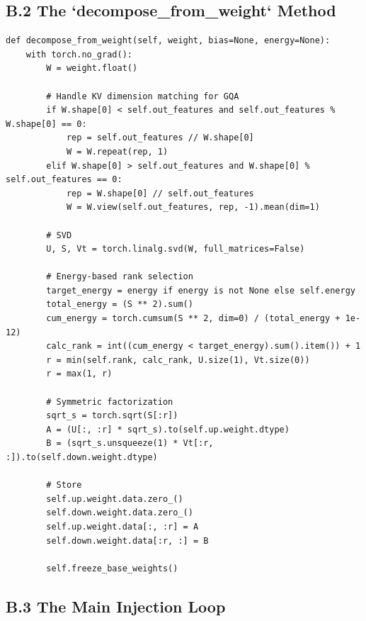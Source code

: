 \subsection{B.2 The `decompose\_from\_weight` Method}

\begin{lstlisting}
def decompose_from_weight(self, weight, bias=None, energy=None):
    with torch.no_grad():
        W = weight.float()
        
        # Handle KV dimension matching for GQA
        if W.shape[0] < self.out_features and self.out_features % W.shape[0] == 0:
            rep = self.out_features // W.shape[0]
            W = W.repeat(rep, 1)
        elif W.shape[0] > self.out_features and W.shape[0] % self.out_features == 0:
            rep = W.shape[0] // self.out_features
            W = W.view(self.out_features, rep, -1).mean(dim=1)
        
        # SVD
        U, S, Vt = torch.linalg.svd(W, full_matrices=False)
        
        # Energy-based rank selection
        target_energy = energy if energy is not None else self.energy
        total_energy = (S ** 2).sum()
        cum_energy = torch.cumsum(S ** 2, dim=0) / (total_energy + 1e-12)
        calc_rank = int((cum_energy < target_energy).sum().item()) + 1
        r = min(self.rank, calc_rank, U.size(1), Vt.size(0))
        r = max(1, r)
        
        # Symmetric factorization
        sqrt_s = torch.sqrt(S[:r])
        A = (U[:, :r] * sqrt_s).to(self.up.weight.dtype)
        B = (sqrt_s.unsqueeze(1) * Vt[:r, :]).to(self.down.weight.dtype)
        
        # Store
        self.up.weight.data.zero_()
        self.down.weight.data.zero_()
        self.up.weight.data[:, :r] = A
        self.down.weight.data[:r, :] = B
        
        self.freeze_base_weights()
\end{lstlisting}

\subsection{B.3 The Main Injection Loop}

